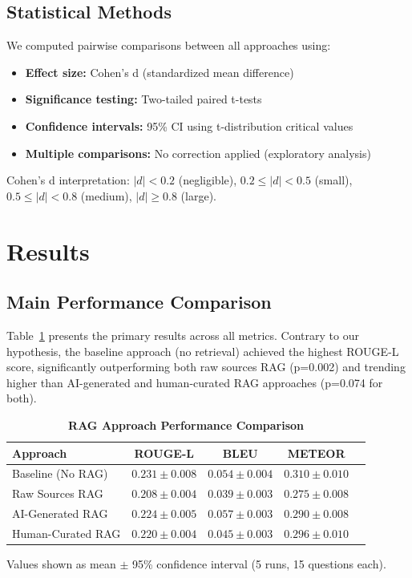 \documentclass[10pt,letterpaper]{article}
\begin{document}
\subsection*{Statistical Methods}
We computed pairwise comparisons between all approaches using:
\begin{itemize}
    \item \textbf{Effect size:} Cohen's d (standardized mean difference)
    \item \textbf{Significance testing:} Two-tailed paired t-tests
    \item \textbf{Confidence intervals:} 95\% CI using t-distribution critical values
    \item \textbf{Multiple comparisons:} No correction applied (exploratory analysis)
\end{itemize}

Cohen's d interpretation: $|d| < 0.2$ (negligible), $0.2 \leq |d| < 0.5$ (small), $0.5 \leq |d| < 0.8$ (medium), $|d| \geq 0.8$ (large).

\section*{Results}

\subsection*{Main Performance Comparison}
Table~\ref{tab:main_results} presents the primary results across all metrics. Contrary to our hypothesis, the baseline approach (no retrieval) achieved the highest ROUGE-L score, significantly outperforming both raw sources RAG (p=0.002) and trending higher than AI-generated and human-curated RAG approaches (p=0.074 for both).

\begin{table}[h!]
\centering
\caption{\bf RAG Approach Performance Comparison}
\begin{tabular}{lcccc}
\toprule
\textbf{Approach} & \textbf{ROUGE-L} & \textbf{BLEU} & \textbf{METEOR} \\
\midrule
Baseline (No RAG) & $0.231 \pm 0.008$ & $0.054 \pm 0.004$ & $0.310 \pm 0.010$ \\
Raw Sources RAG & $0.208 \pm 0.004$ & $0.039 \pm 0.003$ & $0.275 \pm 0.008$ \\
AI-Generated RAG & $0.224 \pm 0.005$ & $0.057 \pm 0.003$ & $0.290 \pm 0.008$ \\
Human-Curated RAG & $0.220 \pm 0.004$ & $0.045 \pm 0.003$ & $0.296 \pm 0.010$ \\
\bottomrule
\end{tabular}
\begin{flushleft}
Values shown as mean $\pm$ 95\% confidence interval (5 runs, 15 questions each).
\end{flushleft}
\label{tab:main_results}
\end{table}
\end{document}
